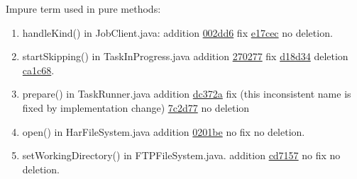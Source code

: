   \begin{figure*}[!htb]
  \begin{minipage}{1\textwidth}
Impure term used in pure methods:
\begin{enumerate}
\item handleKind() in JobClient.java:  addition \href{https://github.com/apache/hadoop/commit/002dd6968b89ded6a77858ccb50c9b2df074c226#diff-489fac1eb320e92dd65b62f00b67f71c}{002dd6} fix  \href{https://github.com/apache/hadoop/commit/e17cec#diff-489fac1eb320e92dd65b62f00b67f71c}{e17cec} no deletion.
\item  startSkipping() in TaskInProgress.java addition \href{https://github.com/apache/hadoop/commit/270277b9307c8de9df523e94bfc46df423e62b53#diff-7f17e003fb54ff97abf2007fbd6cdc61}{270277} fix  \href{https://github.com/apache/hadoop/commit/d18d34e93#diff-7f17e003fb54ff97abf2007fbd6cdc61}{d18d34} deletion \href{https://github.com/apache/hadoop/commit/ca1c68}{ca1c68}.
\item  prepare() in TaskRunner.java  addition \href{https://github.com/apache/hadoop/blob/dc372af412a5923f04feaad8925a16d89180bc8d/src/java/org/apache/hadoop/mapred/TaskRunner.java}{dc372a} fix (this inconsistent name is fixed by implementation change)   \href{https://github.com/apache/hadoop/commit/7c2d77#diff-c0169961c9fbca7c0a7b3afb2049665a}{7c2d77} no deletion
\item  open() in HarFileSystem.java addition \href{https://github.com/apache/hadoop/commit/0201be46c298e94176ec6297e9d9cdba3afc2bbd#diff-685393e5e55e645ac340ea5bfd3b1cf1}{0201be}  no fix no deletion.
\item  setWorkingDirectory() in FTPFileSystem.java. addition \href{https://github.com/apache/hadoop/blob/3b85bd7c3391719624a261f061a67cc4356be477/hadoop-common-project/hadoop-common/src/main/java/org/apache/hadoop/fs/ftp/FTPFileSystem.java}{cd7157}  no fix no deletion.

\end{enumerate}
\end{minipage}
\end{figure*}
